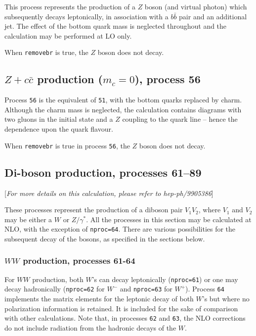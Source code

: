 \documentclass[12pt]{article}
\begin{document}
This process represents the production of a $Z$ boson (and virtual photon)
which subsequently decays leptonically, in association
with a $b{\bar b}$ pair and an additional jet.
The effect of the bottom quark mass is neglected throughout
and the calculation may be performed at LO only.

When {\tt removebr} is true, the $Z$ boson does not decay.

\subsection{$Z+c{\bar c}$ production ($m_c=0$), process 56}
\label{subsec:zccmassless}

Process {\tt 56} is the equivalent of {\tt 51}, with the bottom quarks
replaced by charm. Although the charm mass is neglected, the calculation
contains diagrams with two gluons in the initial state and a
$Z$ coupling to the quark line -- hence the dependence upon the quark
flavour.

When {\tt removebr} is true in process {\tt 56}, the $Z$ boson does not decay.

\subsection{Di-boson production, processes 61--89}
\label{subsec:diboson}

\begin{center}
[{\it For more details on this calculation, please refer to hep-ph/9905386}]
\end{center}

These processes represent the production of a diboson pair $V_1 V_2$,
where $V_1$ and $V_2$ may be either a $W$ or $Z/\gamma^*$. 
All the processes in this section may be calculated at NLO, with the exception
of {\tt nproc=64}. There are various
possibilities for the subsequent decay of the bosons, as specified in the
sections below.

\subsubsection{$WW$ production, processes 61-64}

For $WW$ production, both $W$'s can decay leptonically ({\tt nproc=61}) or one
may decay hadronically ({\tt nproc=62} for $W^-$ and {\tt nproc=63} for $W^+$).
Process {\tt 64} implements the matrix elements for the leptonic decay of
both $W$'s but where no polarization information is retained. It is included
for the sake of comparison with other calculations. Note that, in processes
{\tt 62} and {\tt 63}, the NLO corrections do not include radiation from the
hadronic decays of the $W$.
\end{document}
